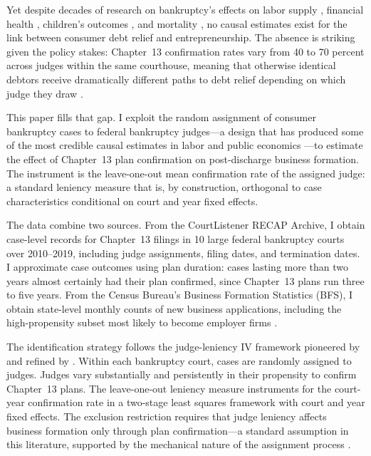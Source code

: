 \documentclass[12pt]{article}
\begin{document}
Yet despite decades of research on bankruptcy's effects on labor supply \citep{dobbie2015}, financial health \citep{dobbie2017}, children's outcomes \citep{hamdi2024}, and mortality \citep{dobbie2015}, no causal estimates exist for the link between consumer debt relief and entrepreneurship. The absence is striking given the policy stakes: Chapter~13 confirmation rates vary from 40 to 70 percent across judges within the same courthouse, meaning that otherwise identical debtors receive dramatically different paths to debt relief depending on which judge they draw \citep{sullivan2006, braucher2012}.

This paper fills that gap. I exploit the random assignment of consumer bankruptcy cases to federal bankruptcy judges---a design that has produced some of the most credible causal estimates in labor and public economics \citep{kling2006, dobbie2015, maestas2013}---to estimate the effect of Chapter~13 plan confirmation on post-discharge business formation. The instrument is the leave-one-out mean confirmation rate of the assigned judge: a standard leniency measure that is, by construction, orthogonal to case characteristics conditional on court and year fixed effects.

The data combine two sources. From the CourtListener RECAP Archive, I obtain case-level records for Chapter~13 filings in 10 large federal bankruptcy courts over 2010--2019, including judge assignments, filing dates, and termination dates. I approximate case outcomes using plan duration: cases lasting more than two years almost certainly had their plan confirmed, since Chapter~13 plans run three to five years. From the Census Bureau's Business Formation Statistics (BFS), I obtain state-level monthly counts of new business applications, including the high-propensity subset most likely to become employer firms \citep{haltiwanger2020}.

The identification strategy follows the judge-leniency IV framework pioneered by \citet{kling2006} and refined by \citet{dobbie2015}. Within each bankruptcy court, cases are randomly assigned to judges. Judges vary substantially and persistently in their propensity to confirm Chapter~13 plans. The leave-one-out leniency measure instruments for the court-year confirmation rate in a two-stage least squares framework with court and year fixed effects. The exclusion restriction requires that judge leniency affects business formation only through plan confirmation---a standard assumption in this literature, supported by the mechanical nature of the assignment process \citep{frandsen2023}.
\end{document}
